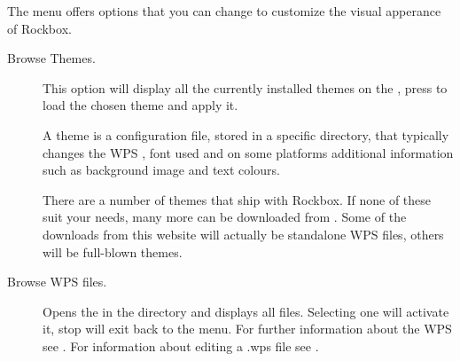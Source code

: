 The  menu offers options that you can change to
customize the visual apperance of Rockbox.

\begin{description}
\item[Browse Themes.]
  This option will display all the currently installed themes on the \dap{}, 
  press \ActionTreeEnter{} to load the chosen theme and apply it.

  A theme is a configuration file, stored in a specific directory, 
  that typically changes the WPS 
  , font used and on some platforms
  additional information such as background image and text colours.

  There are a number of themes that ship with Rockbox. If none of
  these suit your needs, many more can be downloaded from 
  .
  Some of the downloads from this website will actually be standalone WPS files, 
  others will be full-blown themes. 



\item[Browse WPS files.]
  Opens the  in the  directory and
  displays all  files. Selecting one will activate it, stop will
  exit back to the menu. For further information about the WPS see 
  . For information about editing a .wps file see
  .



\end{description}
